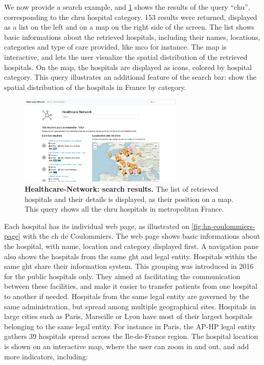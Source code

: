 We now provide a search example, and \cref{fig:hn-search} shows the results of
the query ``chu'', corresponding to the \acf{chru} hospital category. 153
results were returned, displayed as a list on the left and on a map on the right
side of the screen. The list shows basic informations about the retrieved
hospitals, including their names, locations, categories and type of care
provided, like \acf{mco} for instance. The map is interactive, and lets the user
visualize the spatial distribution of the retrieved hospitals. On the map, the
hospitals are displayed as icons, colored by hospital category. This query
illustrates an additional feature of the search bar: show the spatial distribution
of the hospitals in France by category.

\begin{figure}[H]
    \includegraphics[width=0.7\textwidth]{images/healthcare-network/search.png}
    \centering
    \caption{ \textbf{Healthcare-Network: search results.} The list of retrieved
        hospitals and their details is displayed, as their position on a map.
        This query shows all the \ac{chru} hospitals in metropolitan France. }
    \label{fig:hn-search}
\end{figure}

Each hospital has its individual web page, as illustrated on
\cref{fig:hn-coulommiers-page} with the \ac{ch} de Coulommiers. The web page
shows basic informations about the hospital, with name, location and category
displayed first. A navigation pane also shows the hospitals from the same
\ac{ght} and legal entity. Hospitals within the same \ac{ght} share their
information system. This grouping was introduced in 2016 for the public
hospitals only. They aimed at facilitating the communication between these
facilities, and make it easier to transfer patients from one hospital to another
if needed. Hospitals from the same legal entity are governed by the same
administration, but spread among multiple geographical sites. Hospitals in large
cities such as Paris, Marseille or Lyon have most of their largest hospitals
belonging to the same legal entity. For instance in Paris, the AP-HP legal entity
gathers 39 hospitals spread across the Ile-de-France region.
The hospital location is shown on an interactive map, where the user can
zoom in and out, and add more indicators, including:

